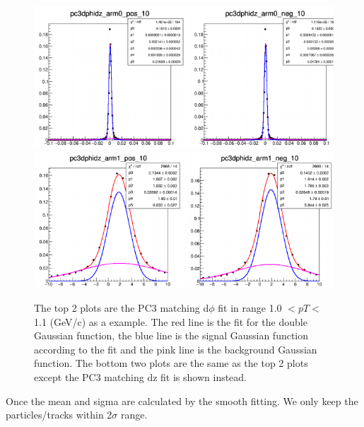 \begin{figure}[h!]
\begin{center}
\includegraphics[scale=0.45]{figs/pc3dphi.png}
\includegraphics[scale=0.45]{figs/pc3dz.png}
\end{center}
\label{fig:pc3_sig}
\caption{The top 2 plots are the PC3 matching d$\phi$ fit in range 1.0 $< pT <$ 1.1 (GeV/c) as a example.
The red line is the fit for the double Gaussian function, the blue line is the signal
Gaussian function according to the fit and the pink line is the background Gaussian
function. The bottom two plots are the same as the top 2 plots except the PC3 matching dz fit is shown instead.}
\end{figure}

Once the mean and sigma are calculated by the smooth fitting. We only keep
the particles/tracks within 2$\sigma$ range.


